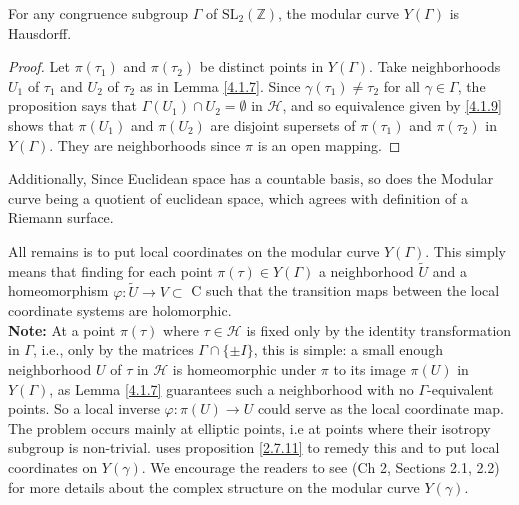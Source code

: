 \begin{theorem}
    For any congruence subgroup $\Gamma$ of $\mathrm{SL}_{2}(\mathbb{Z})$, the modular curve $Y(\Gamma)$ is Hausdorff.
\begin{proof}
    Let $\pi\left(\tau_{1}\right)$ and $\pi\left(\tau_{2}\right)$ be distinct points in $Y(\Gamma)$. Take neighborhoods $U_{1}$ of $\tau_{1}$ and $U_{2}$ of $\tau_{2}$ as in Lemma \ref{4.1.7}. Since $\gamma\left(\tau_{1}\right) \neq \tau_{2}$ for all $\gamma \in \Gamma$, the proposition says that $\Gamma\left(U_{1}\right) \cap U_{2}=\emptyset$ in $\mathcal{H}$, and so equivalence given by \ref{4.1.9}  shows that $\pi\left(U_{1}\right)$ and $\pi\left(U_{2}\right)$ are disjoint supersets of $\pi\left(\tau_{1}\right)$ and $\pi\left(\tau_{2}\right)$ in $Y(\Gamma)$. They are neighborhoods since $\pi$ is an open mapping.

\end{proof}
    
\end{theorem}

\begin{remark}
    Additionally, Since Euclidean space has a countable basis, so does the Modular curve being a quotient of euclidean space, which agrees with definition of a Riemann surface. 


    
\end{remark}
 All remains is to put local coordinates on the modular curve $Y(\Gamma).$ This simply means that finding for each point $\pi(\tau) \in Y(\Gamma)$ a neighborhood $\widetilde{U}$  and a homeomorphism $\varphi: \widetilde{U} \longrightarrow V \subset$ C such that the transition maps between the local coordinate systems are holomorphic.
\\
\textbf{Note:} At a point $\pi(\tau)$ where $\tau \in \mathcal{H}$ is fixed only by the identity transformation in $\Gamma$, i.e., only by the matrices $\Gamma \cap\{ \pm I\}$, this is simple: a small enough neighborhood $U$ of $\tau$ in $\mathcal{H}$ is homeomorphic under $\pi$ to its image $\pi(U)$ in $Y(\Gamma)$, as Lemma \ref{4.1.7} guarantees such a neighborhood with no $\Gamma$-equivalent points. So a local inverse $\varphi: \pi(U) \longrightarrow U$ could serve as the local coordinate map. The problem occurs mainly at elliptic points, i.e at points where their isotropy subgroup is non-trivial. \cite{diamond2005first} uses proposition \ref{2.7.11} to remedy this and to put local coordinates on $Y(\gamma)$. We encourage the readers to see \cite{diamond2005first} (Ch 2, Sections 2.1, 2.2) for more details about the complex structure on the modular curve $Y(\gamma)$.
\bigskip


